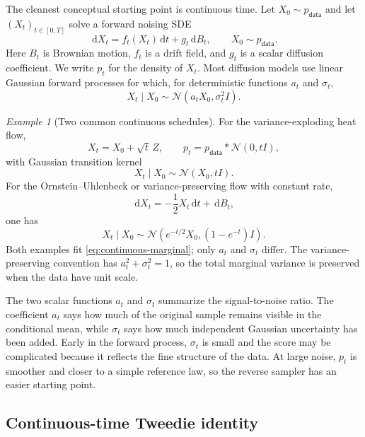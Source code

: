 \documentclass{amsart}
\numberwithin{equation}{section}
\theoremstyle{plain}
\theoremstyle{definition}
\theoremstyle{remark}
\newtheorem*{example}{Example}
\newcommand{\dd}{\,\mathrm{d}}
\newcommand{\Id}{I}
\newcommand{\pdata}{p_{\mathsf{data}}}
\newcommand{\normal}[2]{\mathcal{N}\!\left(#1,#2\right)}
\begin{document}
The cleanest conceptual starting point is continuous time.  Let
$X_0\sim\pdata$ and let $(X_t)_{t\in[0,T]}$ solve a forward noising SDE
\begin{equation}\label{eq:forward-sde}
    \dd X_t=f_t(X_t)\dd t+g_t\dd B_t,
    \qquad X_0\sim\pdata.
\end{equation}
Here $B_t$ is Brownian motion, $f_t$ is a drift field, and $g_t$ is a scalar
diffusion coefficient.  We write $p_t$ for the density of $X_t$.
Most diffusion models use linear Gaussian forward processes for which, for
deterministic functions $a_t$ and $\sigma_t$,
\begin{equation}\label{eq:continuous-marginal}
    X_t\mid X_0\sim\normal{a_tX_0}{\sigma_t^2\Id}.
\end{equation}
\begin{example}[Two common continuous schedules]
For the variance-exploding heat flow,
\[
    X_t=X_0+\sqrt t\,Z,\qquad p_t=\pdata*\normal{0}{t\Id},
\]
with Gaussian transition kernel
\[
    X_t\mid X_0\sim\normal{X_0}{t\Id}.
\]
For the Ornstein--Uhlenbeck or variance-preserving flow with constant rate,
\[
    \dd X_t=-\frac12 X_t\dd t+\dd B_t,
\]
one has
\[
    X_t\mid X_0\sim\normal{e^{-t/2}X_0}{(1-e^{-t})\Id}.
\]
Both examples fit \eqref{eq:continuous-marginal}; only $a_t$ and
$\sigma_t$ differ.  The variance-preserving convention has
$a_t^2+\sigma_t^2=1$, so the total marginal variance is preserved when the data
have unit scale.
\end{example}

The two scalar functions $a_t$ and $\sigma_t$ summarize the signal-to-noise
ratio.  The coefficient $a_t$ says how much of the original sample remains
visible in the conditional mean, while $\sigma_t$ says how much independent
Gaussian uncertainty has been added.  Early in the forward process,
$\sigma_t$ is small and the score may be complicated because it reflects the
fine structure of the data.  At large noise, $p_t$ is smoother and closer to a
simple reference law, so the reverse sampler has an easier starting point.


\subsection{Continuous-time Tweedie identity}\label{subsec:continuous-tweedie}
\end{document}
